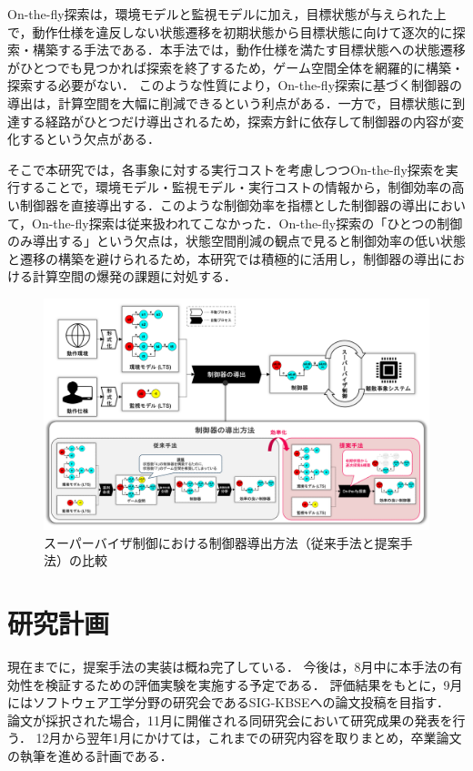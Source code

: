 \documentclass[11pt]{jarticle}
\begin{document}
On-the-fly探索\cite{ddcs}は，環境モデルと監視モデルに加え，目標状態が与えられた上で，動作仕様を違反しない状態遷移を初期状態から目標状態に向けて逐次的に探索・構築する手法である．本手法では，動作仕様を満たす目標状態への状態遷移がひとつでも見つかれば探索を終了するため，ゲーム空間全体を網羅的に構築・探索する必要がない．
このような性質により，On-the-fly探索に基づく制御器の導出は，計算空間を大幅に削減できるという利点がある．一方で，目標状態に到達する経路がひとつだけ導出されるため，探索方針に依存して制御器の内容が変化するという欠点がある．

そこで本研究では，各事象に対する実行コストを考慮しつつOn-the-fly探索を実行することで，環境モデル・監視モデル・実行コストの情報から，制御効率の高い制御器を直接導出する．このような制御効率を指標とした制御器の導出において，On-the-fly探索は従来扱われてこなかった．On-the-fly探索の「ひとつの制御のみ導出する」という欠点は，状態空間削減の観点で見ると制御効率の低い状態と遷移の構築を避けられるため，本研究では積極的に活用し，制御器の導出における計算空間の爆発の課題に対処する．

\begin{figure}[h]
  \centering
  \includegraphics[width=16cm]{./figures/proposal.png}
  \caption{スーパーバイザ制御における制御器導出方法（従来手法と提案手法）の比較}
  \label{fig:3}
\end{figure}


\section{研究計画}
現在までに，提案手法の実装は概ね完了している．
今後は，8月中に本手法の有効性を検証するための評価実験を実施する予定である．
評価結果をもとに，9月にはソフトウェア工学分野の研究会であるSIG-KBSEへの論文投稿を目指す．
論文が採択された場合，11月に開催される同研究会において研究成果の発表を行う．
12月から翌年1月にかけては，これまでの研究内容を取りまとめ，卒業論文の執筆を進める計画である．
\end{document}
